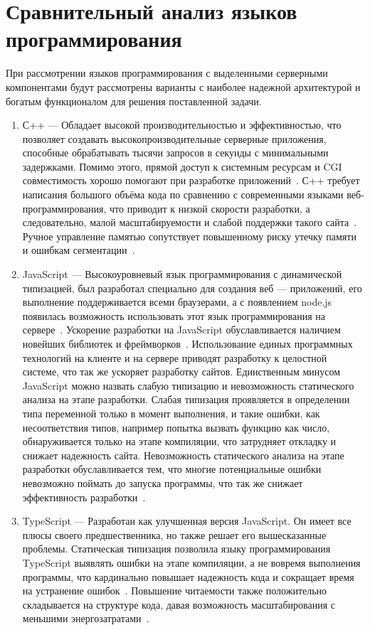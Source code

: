 \section{Сравнительный анализ языков программирования}

При рассмотрении языков программирования с выделенными серверными компонентами будут рассмотрены варианты с наиболее надежной архитектурой и богатым функционалом для решения поставленной задачи.
\begin{enumerate}
    \item С++ — Обладает высокой производительностью и эффективностью, что позволяет создавать высокопроизводительные серверные приложения, способные обрабатывать тысячи запросов в секунды с минимальными задержками. Помимо этого, прямой доступ к системным ресурсам и CGI совместимость хорошо помогают при разработке приложений~\cite{bookCppQt}. С++ требует написания большого объёма кода по сравнению с современными языками веб-программирования, что приводит к низкой скорости разработки, а следовательно, малой масштабируемости и слабой поддержки такого сайта~\cite{bookCppQt}. Ручное управление памятью сопутствует повышенному риску утечку памяти и ошибкам сегментации~\cite{cppWebProgramming}.

    \item JavaScript — Высокоуровневый язык программирования с динамической типизацией, был разработал специально для создания веб — приложений, его выполнение поддерживается всеми браузерами, а с появлением node.js появилась возможность использовать этот язык программирования на сервере~\cite{bookJavaScript}. Ускорение разработки на JavaScript обуславливается наличием новейших библиотек и фреймворков~\cite{bookJavaScript}. Использование единых программных технологий на клиенте и на сервере приводят разработку к целостной системе, что так же ускоряет разработку сайтов. Единственным минусом JavaScript можно назвать слабую типизацию и невозможность статического анализа на этапе разработки. Слабая типизация проявляется в определении типа переменной только в момент выполнения, и такие ошибки, как несоответствия типов, например попытка вызвать функцию как число, обнаруживается только на этапе компиляции, что затрудняет откладку и снижает надежность сайта. Невозможность статического анализа на этапе разработки обуславливается тем, что многие потенциальные ошибки невозможно поймать до запуска программы, что так же снижает эффективность разработки~\cite{bookJavaScript}.
    
    \item TypeScript — Разработан как улучшенная версия JavaScript. Он имеет все плюсы своего предшественника, но также решает его вышесказанные проблемы. Статическая типизация позволила языку программирования TypeScript выявлять ошибки на этапе компиляции, а не вовремя выполнения программы, что кардинально повышает надежность кода и сокращает время на устранение ошибок~\cite{bookTypeScript}. Повышение читаемости также положительно складывается на структуре кода, давая возможность масштабирования с меньшими энергозатратами~\cite{bookTypeScript}.
    

\end{enumerate}
